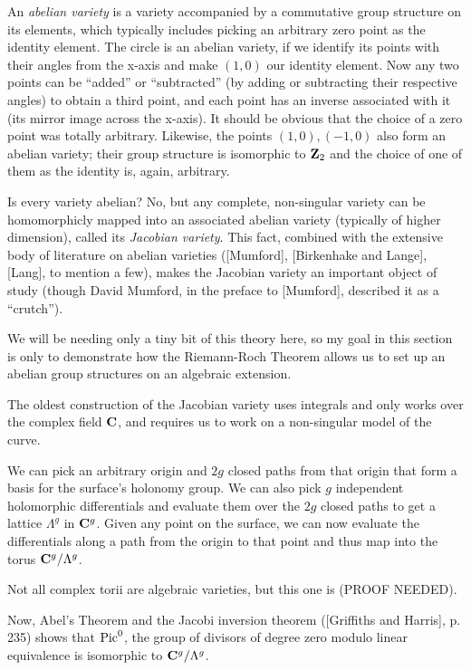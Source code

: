 An {\it abelian variety} is a variety accompanied by a commutative
group structure on its elements, which typically includes picking an
arbitrary zero point as the identity element.  The circle is an
abelian variety, if we identify its points with their angles from the
x-axis and make $(1,0)$ our identity element.  Now any two points can
be ``added'' or ``subtracted'' (by adding or subtracting their
respective angles) to obtain a third point, and each point has an
inverse associated with it (its mirror image across the x-axis).  It
should be obvious that the choice of a zero point was totally
arbitrary.  Likewise, the points ${(1,0), (-1,0)}$ also form an
abelian variety; their group structure is isomorphic to ${\bf Z}_2$ and
the choice of one of them as the identity is, again, arbitrary.

Is every variety abelian?  No, but any complete, non-singular variety
can be homomorphicly mapped into an associated abelian variety
(typically of higher dimension), called its {\it Jacobian variety}.
This fact, combined with the extensive body of literature on abelian
varieties ([Mumford], [Birkenhake and Lange], [Lang], to mention a
few), makes the Jacobian variety an important object of study (though
David Mumford, in the preface to [Mumford], described it as a
``crutch'').

We will be needing only a tiny bit of this theory here, so my goal in
this section is only to demonstrate how the Riemann-Roch Theorem
allows us to set up an abelian group structures on an algebraic
extension.

The oldest construction of the Jacobian variety uses integrals
and only works over the complex field $\mathbf{C}$, and requires us
to work on a non-singular model of the curve.

We can pick an arbitrary origin and $2g$ closed paths from that
origin that form a basis for the surface's holonomy group.
We can also pick $g$ independent holomorphic differentials
and evaluate them over the $2g$ closed paths to get a lattice
$\Lambda^g$ in $\mathbf{C}^g$.  Given any point on the surface,
we can now evaluate the differentials along a path from
the origin to that point and thus map into the torus
$\mathbf{C}^g/\Lambda^g$.

Not all complex torii are algebraic varieties, but this one is (PROOF
NEEDED).

Now, Abel's Theorem and the Jacobi inversion theorem ([Griffiths and
Harris], p. 235) shows that ${\rm Pic}^0$, the group of divisors of
degree zero modulo linear equivalence is isomorphic to
$\mathbf{C}^g/\Lambda^g$.

